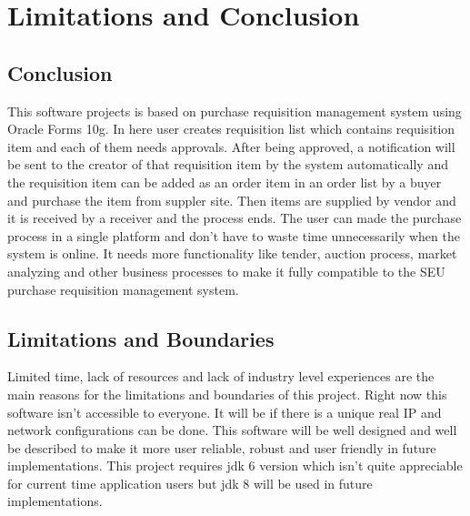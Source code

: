 \documentclass[12pt]{report} %
\begin{document}
\chapter{Limitations and Conclusion}
\setcounter{page}{1}
\thispagestyle{empty}    %
\section*{Conclusion}
This software projects is based on purchase requisition management system using Oracle Forms 10g. In here user creates requisition list which contains requisition item and each of them needs approvals. After being approved, a notification will be sent to the creator of that requisition item by the system automatically and the requisition item can be added as an order item in an order list by a buyer and purchase the item from suppler site. Then items are supplied by vendor and it is received by a receiver and the process ends. The user can made the purchase process in a single platform and don't have to waste time unnecessarily when the system is online. It needs more functionality like tender, auction process, market analyzing and other business processes to make it fully compatible to the SEU purchase requisition management system.


\section*{Limitations and Boundaries}
Limited time, lack of resources and lack of industry level experiences are the main reasons for the limitations and boundaries of this project. Right now this software isn't accessible to everyone. It will be if there is a unique real IP and network configurations can be done. This software will be well designed and well be described to make it more user reliable, robust and user friendly in future implementations. This project requires jdk 6 version which isn't quite appreciable for current time application users but jdk 8 will be used in future implementations. 
\end{document}

